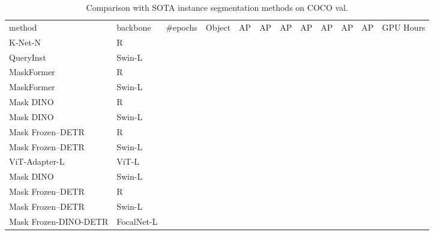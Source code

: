 \documentclass[10pt,twocolumn,letterpaper]{article}
\newcommand{\cmark}{\ding{51}}\newcommand{\xmark}{\ding{55}}
\begin{document}
\begin{table*}[t]
\begin{minipage}[t]{1\linewidth}
\centering\setlength{\tabcolsep}{5pt}
\footnotesize
\renewcommand{\arraystretch}{1.2}
\label{tab:coco_instance_exp}
\resizebox{\linewidth}{!}
{
\begin{tabular}{l|l|c|c|c|c|cccccc}
method & backbone & \#epochs  & Object & AP & AP & AP & AP & AP & AP & AP & GPU Hours \\
\shline
K-Net-N~\cite{zhang2021k} & R &  & \xmark &  &  &  &  &  &  &  & \\
QueryInst~\cite{FangQueryInst} & Swin-L &  & \xmark &  &  &  &  &  &  &  &  \\

MaskFormer~\cite{cheng2021masked} & R &  & \xmark &  &  &  &  &  &  &  &    \\
MaskFormer~\cite{cheng2021masked} & Swin-L &  & \xmark &  &  &  &  &  &  &  &    \\ 
Mask DINO~\cite{li2022mask} & R &  & \xmark &  &  &  &  &  &  &  &  \\
Mask DINO~\cite{li2022mask} & Swin-L &  & \xmark &  &  &  &  &  &  &  &  \\
\rowcolor{gray!8}Mask Frozen--DETR &R &  & \xmark&  &  &  &  &  &  &  &  \\
\rowcolor{gray!8}Mask Frozen--DETR & Swin-L &  & \xmark &  &  &  &  &  &  &  & \\
\hline
ViT-Adapter-L~\cite{chen2022vitadapter} & ViT-L &  & \cmark &  &  &  &  &  &  &  &  \\
Mask DINO~\cite{li2022mask} & Swin-L &  & \cmark &  &  &  &  &  &  &  &  \\
\rowcolor{gray!8}Mask Frozen--DETR &R &  & \cmark &  &  &  &  &  &  &  & \\
\rowcolor{gray!8}Mask Frozen--DETR & Swin-L &  & \cmark &  &  &  &  &  &  &  & \\
\rowcolor{gray!8}Mask Frozen-DINO-DETR & FocalNet-L &  & \cmark&  &  &  &  &  &  &  & \\
\end{tabular}
}
\caption{\small{Comparison with SOTA instance segmentation methods on COCO val.}
}
\label{coco_instance_exp}
\vspace{2mm}
\end{minipage}
\begin{minipage}[t]{1\linewidth}
\vspace{2mm}
\centering
\setlength{\tabcolsep}{7pt}
\footnotesize
\renewcommand{\arraystretch}{1.35}
\resizebox{1.0\linewidth}{!}
{
}
\end{minipage}
\end{table*}
\end{document}
